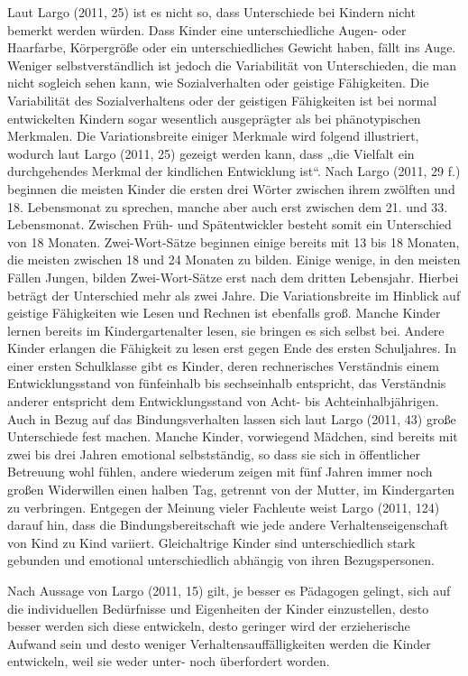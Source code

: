 Laut Largo (2011, 25) ist es nicht so, dass Unterschiede bei Kindern nicht bemerkt werden würden. Dass Kinder eine unterschiedliche Augen- oder Haarfarbe, Körpergröße oder ein unterschiedliches Gewicht haben, fällt ins Auge. Weniger selbstverständlich ist jedoch die Variabilität von Unterschieden, die man nicht sogleich sehen kann, wie Sozialverhalten oder geistige Fähigkeiten. Die Variabilität des Sozialverhaltens oder der geistigen Fähigkeiten ist bei normal entwickelten Kindern sogar wesentlich ausgeprägter als bei phänotypischen Merkmalen. Die Variationsbreite einiger Merkmale wird folgend illustriert, wodurch laut Largo (2011, 25) gezeigt werden kann, dass „die Vielfalt ein durchgehendes Merkmal der kindlichen Entwicklung ist“. Nach Largo (2011, 29 f.) beginnen die meisten Kinder die ersten drei Wörter zwischen ihrem zwölften und 18. Lebensmonat zu sprechen, manche aber auch erst zwischen dem 21. und 33. Lebensmonat. Zwischen Früh- und Spätentwickler besteht somit ein Unterschied von 18 Monaten. Zwei-Wort-Sätze beginnen einige bereits mit 13 bis 18 Monaten, die meisten zwischen 18 und 24 Monaten zu bilden. Einige wenige, in den meisten Fällen Jungen, bilden Zwei-Wort-Sätze erst nach dem dritten Lebensjahr. Hierbei beträgt der Unterschied mehr als zwei Jahre. Die Variationsbreite im Hinblick auf geistige Fähigkeiten wie Lesen und Rechnen ist ebenfalls groß. Manche Kinder lernen bereits im Kindergartenalter lesen, sie bringen es sich selbst bei. Andere Kinder erlangen die Fähigkeit zu lesen erst gegen Ende des ersten Schuljahres. In einer ersten Schulklasse gibt es Kinder, deren rechnerisches Verständnis einem Entwicklungsstand von fünfeinhalb bis sechseinhalb entspricht, das Verständnis anderer entspricht dem Entwicklungsstand von Acht- bis Achteinhalbjährigen. Auch in Bezug auf das Bindungsverhalten lassen sich laut Largo (2011, 43) große Unterschiede fest machen. Manche Kinder, vorwiegend Mädchen, sind bereits mit zwei bis drei Jahren emotional selbstständig, so dass sie sich in öffentlicher Betreuung wohl fühlen, andere wiederum zeigen mit fünf Jahren immer noch großen Widerwillen einen halben Tag, getrennt von der Mutter, im Kindergarten zu verbringen. Entgegen der Meinung vieler Fachleute weist Largo (2011, 124) darauf hin, dass die Bindungsbereitschaft wie jede andere Verhaltenseigenschaft von Kind zu Kind variiert. Gleichaltrige Kinder sind unterschiedlich stark gebunden und emotional unterschiedlich abhängig von ihren Bezugspersonen. 

Nach Aussage von Largo (2011, 15) gilt, je besser es Pädagogen gelingt, sich auf die individuellen Bedürfnisse und Eigenheiten der Kinder einzustellen, desto besser werden sich diese entwickeln, desto geringer wird der erzieherische Aufwand sein und desto weniger Verhaltensauffälligkeiten werden die Kinder entwickeln, weil sie weder unter- noch überfordert worden.   

